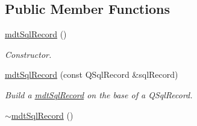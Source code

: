 \subsection*{Public Member Functions}
\begin{DoxyCompactItemize}
\item 
\hypertarget{classmdt_sql_record_a1b171d11ee1b270df4f56007c5609699}{
\hyperlink{classmdt_sql_record_a1b171d11ee1b270df4f56007c5609699}{mdtSqlRecord} ()}
\label{classmdt_sql_record_a1b171d11ee1b270df4f56007c5609699}

\begin{DoxyCompactList}\small\item\em Constructor. \end{DoxyCompactList}\item 
\hypertarget{classmdt_sql_record_a6b658e74e8b1da998f610b7e8a731e0e}{
\hyperlink{classmdt_sql_record_a6b658e74e8b1da998f610b7e8a731e0e}{mdtSqlRecord} (const QSqlRecord \&sqlRecord)}
\label{classmdt_sql_record_a6b658e74e8b1da998f610b7e8a731e0e}

\begin{DoxyCompactList}\small\item\em Build a \hyperlink{classmdt_sql_record}{mdtSqlRecord} on the base of a QSqlRecord. \end{DoxyCompactList}\item 
\hypertarget{classmdt_sql_record_af7e8c8cd4f7265853d746807e063396f}{
\hyperlink{classmdt_sql_record_af7e8c8cd4f7265853d746807e063396f}{$\sim$mdtSqlRecord} ()}
\label{classmdt_sql_record_af7e8c8cd4f7265853d746807e063396f}


\end{DoxyCompactItemize}
